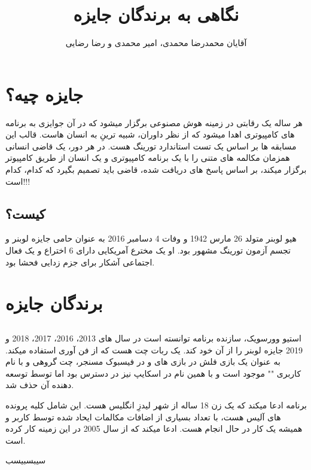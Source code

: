 \documentclass[14pt,a4paper]{report}
\title{نگاهی به برندگان جایزه  \lr{Loebner}}
\author{ آقایان محمدرضا محمدی، امیر محمدی و رضا رضایی}
\begin{document}
	
 	\maketitle
 	\tableofcontents
 	
 	
 	\chapter{جایزه  چیه؟} 
 	هر ساله یک رقابتی در زمینه هوش مصنوعی برگزار میشود که در آن جوایزی به برنامه های کامپیوتری اهدا میشود که از نظر داوران،  شبیه ترینِ به انسان هاست. قالب این مسابقه ها بر اساس یک تست استاندارد تورینگ هست. در هر دور، یک قاضی انسانی همزمان مکالمه های متنی را با یک برنامه کامپیوتری و یک انسان از طریق کامپیوتر برگزار میکند، بر اساس پاسخ های دریافت شده، قاضی باید تصمیم بگیرد که کدام، کدام است!!!
 	
 	\section{ کیست؟}
 	هیو لوبنر متولد 26 مارس 1942 و وفات 4 دسامبر 2016 به عنوان حامی جایزه لوبنر و تجسم آزمون تورینگ مشهور بود. او یک مخترع آمریکایی دارای 6 اختراع و یک فعال اجتماعی آشکار برای جزم زدایی فحشا بود.
 	
 	
 	\chapter{برندگان جایزه }
 	\section{}
 	استیو وورسویک، سازنده برنامه  توانسته است در سال های 2013، 2016، 2017، 2018 و 2019 جایزه لوبنر را از آن خود کند.  یک ربات چت هست که از فن آوری  استفاده میکند.   به عنوان یک بازی فلش در بازی های   و در فیسبوک مسنجر، چت گروهی   و  با نام کاربری "" موجود است و با همین نام در اسکایپ نیز در دسترس بود اما توسط توسعه دهنده آن حذف شد.
 	
 برنامه 	 ادعا میکند که یک زن 18 ساله از شهر لیدزِ انگلیس هست. این شامل کلیه پرونده های  آلیس هست، با تعداد بسیاری از اضافات مکالمات ایحاد شده توسط کاربر و همیشه یک کار در حال انجام هست.  ادعا میکند که از سال 2005 در این زمینه کار کرده است. 
 
 سیبسبیسب
 	
 	
 	
 
 	
\end{document}
